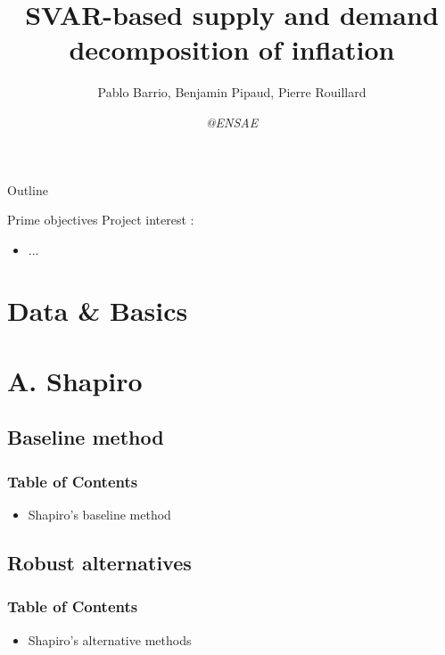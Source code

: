 \documentclass[9pt, xcolor={dvipsnames}]{beamer}
\author{Pablo Barrio, Benjamin Pipaud, Pierre Rouillard}
\title{SVAR-based supply and demand decomposition of inflation}
\institute{xx/xx/xxxx}
\date{\textit{@ENSAE}}
\begin{document}
\begin{frame}[plain]
\titlepage
\centering
\end{frame}

\begin{frame}{Outline}
  \tableofcontents
\end{frame}

\begin{frame}{Prime objectives}
  Project interest :
  \begin{itemize}
    \item ...
  \end{itemize}
\end{frame}

\section{Data \& Basics}
\begin{frame}  
\end{frame}

\section{A. Shapiro}
\subsection{Baseline method}
\begin{frame}
  \frametitle{Table of Contents}
  \tableofcontents[currentsection]
\end{frame}
\begin{frame}
  \begin{itemize}
    \item Shapiro's baseline method
  \end{itemize}
\end{frame}

\subsection{Robust alternatives}
\begin{frame}
  \frametitle{Table of Contents}
  \tableofcontents[currentsection]
\end{frame}
\begin{frame}
  \begin{itemize}
    \item Shapiro's alternative methods
  \end{itemize}
\end{frame}
\end{document}
